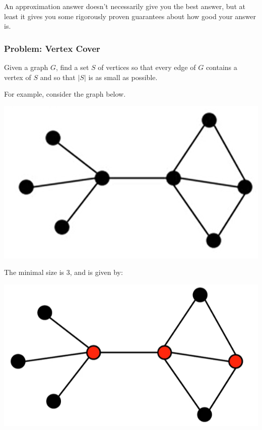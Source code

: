 \documentclass[letterpaper]{article}
\begin{document}
\bigskip 

An approximation answer doesn't necessarily give you the best answer, but at least it gives you some rigorously proven guarantees about how good your answer is. 


\subsubsection{Problem: Vertex Cover}
Given a graph $G$, find a set $S$ of vertices so that every edge of $G$ contains a vertex of $S$ and so that $|S|$ is as small as possible. 

\bigskip 

For example, consider the graph below.
\begin{center}
    \includegraphics[scale=0.5]{assets/vertex_cov.png}
\end{center}
The minimal size is 3, and is given by: 
\begin{center}
    \includegraphics[scale=0.5]{assets/vertex_cov_2.png}
\end{center}
\end{document}

